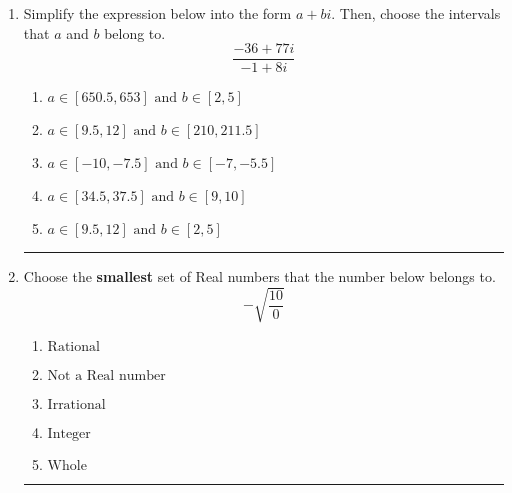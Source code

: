 \documentclass[14pt]{extbook}
\newcommand{\litem}[1]{\item#1\hspace*{-1cm}\rule{\textwidth}{0.4pt}}
\begin{document}
\begin{enumerate}
{\begin{enumerate}[label=\Alph*.]
\end{enumerate} }
\litem{
Simplify the expression below into the form $a+bi$. Then, choose the intervals that $a$ and $b$ belong to.\[ \frac{-36 + 77 i}{-1 + 8 i} \]\begin{enumerate}[label=\Alph*.]
\item \( a \in [650.5, 653] \text{ and } b \in [2, 5] \)
\item \( a \in [9.5, 12] \text{ and } b \in [210, 211.5] \)
\item \( a \in [-10, -7.5] \text{ and } b \in [-7, -5.5] \)
\item \( a \in [34.5, 37.5] \text{ and } b \in [9, 10] \)
\item \( a \in [9.5, 12] \text{ and } b \in [2, 5] \)

\end{enumerate} }
\litem{
Choose the \textbf{smallest} set of Real numbers that the number below belongs to.\[ -\sqrt{\frac{10}{0}} \]\begin{enumerate}[label=\Alph*.]
\item \( \text{Rational} \)
\item \( \text{Not a Real number} \)
\item \( \text{Irrational} \)
\item \( \text{Integer} \)
\item \( \text{Whole} \)

\end{enumerate} }
\end{enumerate}
\end{document}
